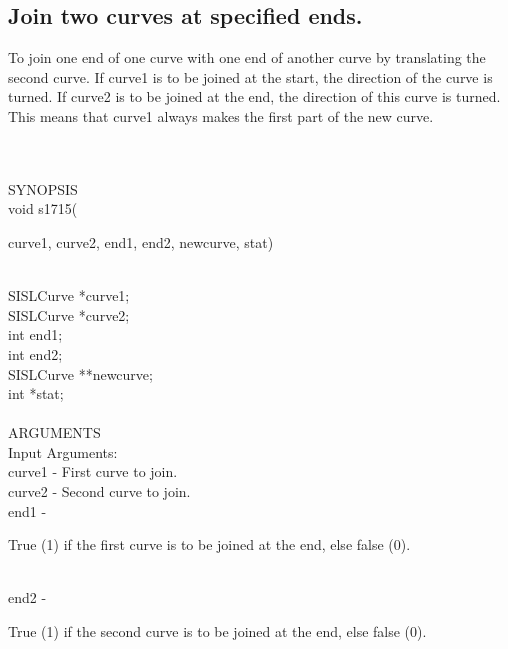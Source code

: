 \subsection{Join two curves at specified ends.}
\begin{minipg1}
  To join one end of one curve with one end of another curve by
  translating the second curve. If {\fov curve1} is to be joined at the start,
  the direction of the curve is turned. If {\fov curve2} is to be joined at the
  end, the direction of this curve is turned. This means that {\fov curve1}
  always makes the first part of the new curve.
\end{minipg1} \\ \\
SYNOPSIS\\
        \>void s1715(\begin{minipg3}
        {\fov curve1}, {\fov curve2}, {\fov end1}, {\fov end2}, {\fov newcurve}, {\fov stat})
                \end{minipg3}\\[0.3ex]
                \>\>    SISLCurve       \>      *{\fov curve1};\\
                \>\>    SISLCurve       \>      *{\fov curve2};\\
                \>\>    int     \>      {\fov end1};\\
                \>\>    int     \>      {\fov end2};\\
                \>\>    SISLCurve       \>      **{\fov newcurve};\\
                \>\>    int     \>      *{\fov stat};\\
\\
ARGUMENTS\\
        \>Input Arguments:\\
        \>\>    {\fov curve1}   \> - \> First curve to join.\\
        \>\>    {\fov curve2}   \> - \> Second curve to join.\\
        \>\>    {\fov end1}     \> - \> \begin{minipg2}
                                True (1) if the first curve is to be joined at the end,
                                else false (0).
                                \end{minipg2}\\[0.3ex]
        \>\>    {\fov end2}     \> - \> \begin{minipg2}
                                True (1) if the second curve is to be joined at the end,
                                else false (0).
                                \end{minipg2}\\[0.3ex]
